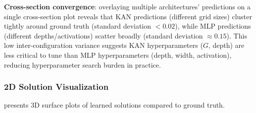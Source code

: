 \documentclass[11pt,a4paper]{article}
\begin{document}
\textbf{Cross-section convergence}: overlaying multiple architectures' predictions on a single cross-section plot reveals that KAN predictions (different grid sizes) cluster tightly around ground truth (standard deviation $< 0.02$), while MLP predictions (different depths/activations) scatter broadly (standard deviation $\approx 0.15$). This low inter-configuration variance suggests KAN hyperparameters ($G$, depth) are less critical to tune than MLP hyperparameters (depth, width, activation), reducing hyperparameter search burden in practice.

\subsubsection{2D Solution Visualization}

 presents 3D surface plots of learned solutions compared to ground truth.
\end{document}
